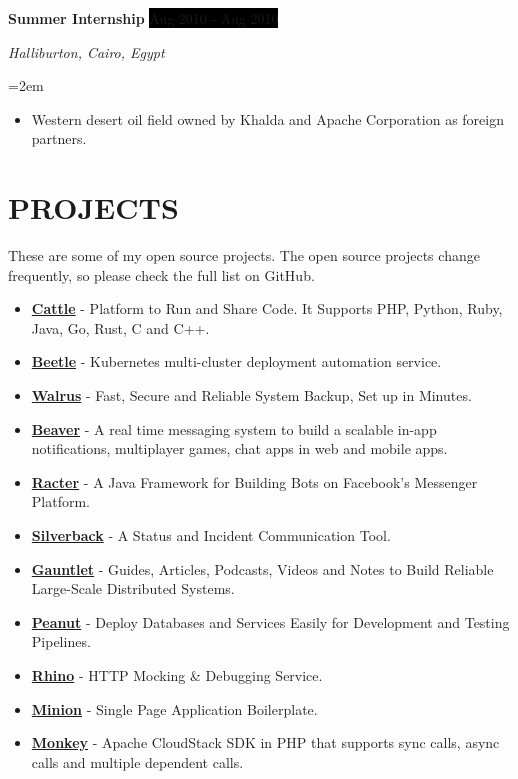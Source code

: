 \documentclass[paper=a4,fontsize=11pt]{scrartcl} %
\newcommand{\NewPart}[1]{\section*{\uppercase{#1}}}
\newcommand{\EducationEntry}[4]{
		\noindent \textbf{#1} \hfill      %
		\colorbox{Black}{%
			\parbox{6em}{%
			\hfill\color{White}#2}} \par  %
		\noindent \textit{#3} \par        %
		\noindent\hangindent=2em\hangafter=0 \small #4 %
		\normalsize \par}
\newcommand{\WorkEntry}[4]{				  %
		\noindent \textbf{#1} \hfill      %
		\colorbox{Black}{\color{White}#2} \par  %
		\noindent \textit{#3} \par              %
		\noindent\hangindent=2em\hangafter=0 \small #4 %
		\normalsize \par}
\begin{document}
\WorkEntry{Summer Internship}{Aug 2010 - Aug 2010}{Halliburton, Cairo, Egypt}{\begin{itemize}
\item Western desert oil field owned by Khalda and Apache Corporation as foreign partners.
\end{itemize}}


\NewPart{Projects}{}

These are some of my open source projects. The open source projects change frequently, so please check the full list on GitHub.

\begin{itemize}
\item \textbf{\href{https://github.com/Clivern/Cattle}{Cattle}} - Platform to Run and Share Code. It Supports PHP, Python, Ruby, Java, Go, Rust, C and C++.
\item \textbf{\href{https://github.com/Clivern/Beetle}{Beetle}} - Kubernetes multi-cluster deployment automation service.
\item \textbf{\href{https://github.com/Clivern/Walrus}{Walrus}} - Fast, Secure and Reliable System Backup, Set up in Minutes.
\item \textbf{\href{https://github.com/Clivern/Beaver}{Beaver}} - A real time messaging system to build a scalable in-app notifications, multiplayer games, chat apps in web and mobile apps.
\item \textbf{\href{https://github.com/Clivern/Racter}{Racter}} - A Java Framework for Building Bots on Facebook's Messenger Platform.
\item \textbf{\href{https://github.com/silverbackhq}{Silverback}} - A Status and Incident Communication Tool.
\item \textbf{\href{https://github.com/Clivern/Gauntlet}{Gauntlet}} - Guides, Articles, Podcasts, Videos and Notes to Build Reliable Large-Scale Distributed Systems.
\item \textbf{\href{https://github.com/Clivern/Peanut}{Peanut}} - Deploy Databases and Services Easily for Development and Testing Pipelines.
\item \textbf{\href{https://github.com/Clivern/Rhino}{Rhino}} - HTTP Mocking \& Debugging Service.
\item \textbf{\href{https://github.com/Clivern/Minion}{Minion}} - Single Page Application Boilerplate.
\item \textbf{\href{https://github.com/Clivern/Monkey}{Monkey}} - Apache CloudStack SDK in PHP that supports sync calls, async calls and multiple dependent calls.

\end{itemize}
\end{document}
